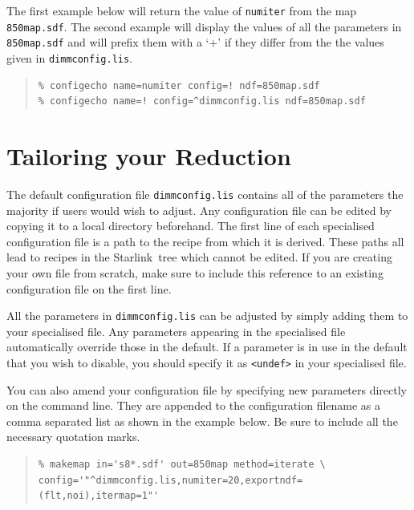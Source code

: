 \documentclass[twoside,11pt]{article}
\newcommand{\htmladdnormallink}[2]{#1}
\newcommand{\xlabel}[1]{}
\renewcommand{\_}{\texttt{\symbol{95}}}
\newenvironment{myquote}{\begin{quote}\begin{small}}{\end{small}\end{quote}}
\newcommand{\starlink}{\htmladdnormallink{Starlink}{http://starlink.jach.hawaii.edu}}
\begin{document}
The first example below will return the value of \texttt{numiter} from
the map \texttt{850map.sdf}. The second example will display the values of all
the parameters in \texttt{850map.sdf} and will prefix them with a `+' if they
differ from the the values given in \texttt{dimmconfig.lis}.

\begin{myquote}
\begin{verbatim}
% configecho name=numiter config=! ndf=850map.sdf
% configecho name=! config=^dimmconfig.lis ndf=850map.sdf
\end{verbatim}
\end{myquote}

\clearpage
\section{\xlabel{tweak}Tailoring your Reduction}
\label{sec:tweak}

The default configuration file \texttt{dimmconfig.lis} contains all of
the parameters the majority if users would wish to adjust. Any
configuration file can be edited by copying it to a local directory
beforehand. The first line of each specialised configuration file is a
path to the recipe from which it is derived. These paths all lead to
recipes in the \starlink\ tree which cannot be edited. If you are
creating your own file from scratch, make sure to include this
reference to an existing configuration file on the first line.

All the parameters in \texttt{dimmconfig.lis} can be adjusted by
simply adding them to your specialised file. Any parameters appearing
in the specialised file automatically override those in the default.
If a parameter is in use in the default that you wish to disable, you
should specify it as \texttt{<undef>} in your specialised file.

You can also amend your configuration file by specifying new
parameters directly on the command line. They are appended to the
configuration filename as a comma separated list as shown in the
example below. Be sure to include all the necessary quotation marks.

\begin{myquote}
\begin{verbatim}
% makemap in='s8*.sdf' out=850map method=iterate \
config='"^dimmconfig.lis,numiter=20,exportndf=(flt,noi),itermap=1"'
\end{verbatim}
\end{myquote}
\end{document}
